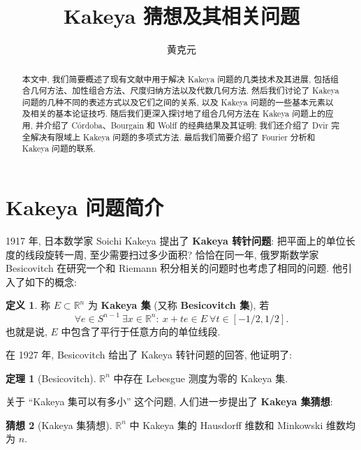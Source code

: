 \documentclass[a4paper]{article}
\numberwithin{equation}{section}
\numberwithin{figure}{section}
\numberwithin{table}{section}
\theoremstyle{definition}
\newtheorem{theorem}{\indent 定理}[section]
\newtheorem{conjecture}[theorem]{\indent 猜想}
\newtheorem*{definition}{\indent 定义}
\newcommand{\R}{\mathbb{R}}
\begin{document}
\title{Kakeya 猜想及其相关问题}
\author{黄克元}
\date{}
\maketitle

\begin{abstract}
    本文中, 我们简要概述了现有文献中用于解决 Kakeya 问题的几类技术及其进展, 包括组合几何方法、加性组合方法、尺度归纳方法以及代数几何方法. 然后我们讨论了 Kakeya 问题的几种不同的表述方式以及它们之间的关系, 以及 Kakeya 问题的一些基本元素以及相关的基本论证技巧. 随后我们更深入探讨地了组合几何方法在 Kakeya 问题上的应用, 并介绍了 C\'ordoba、Bourgain 和 Wolff 的经典结果及其证明; 我们还介绍了 Dvir 完全解决有限域上 Kakeya 问题的多项式方法. 最后我们简要介绍了 Fourier 分析和 Kakeya 问题的联系.
\end{abstract}

\section{Kakeya 问题简介}

1917 年, 日本数学家 Soichi Kakeya 提出了 \textbf{Kakeya 转针问题}: 把平面上的单位长度的线段旋转一周, 至少需要扫过多少面积? 恰恰在同一年, 俄罗斯数学家 Besicovitch 在研究一个和 Riemann 积分相关的问题时也考虑了相同的问题. 他引入了如下的概念:

\begin{definition}
    称 $E\subset\R^n$ 为 \textbf{Kakeya 集} (又称 \textbf{Besicovitch 集}), 若 
    \begin{equation*}
        \forall e\in S^{n-1}\ \exists x\in\R^n:\ x+te\in E\ \forall t\in [-1/2, 1/2].
    \end{equation*}
    也就是说, $E$ 中包含了平行于任意方向的单位线段.
\end{definition}

在 1927 年, Besicovitch 给出了 Kakeya 转针问题的回答, 他证明了:

\begin{theorem}[Besicovitch\cite{besicovitch1928kakeya}]
    $\R^n$ 中存在 Lebesgue 测度为零的 Kakeya 集.
\end{theorem}

关于 ``Kakeya 集可以有多小'' 这个问题, 人们进一步提出了 \textbf{Kakeya 集猜想}:

\begin{conjecture}[Kakeya 集猜想]
    $\R^n$ 中 Kakeya 集的 Hausdorff 维数和 Minkowski 维数均为 $n$.
\end{conjecture}
\end{document}
